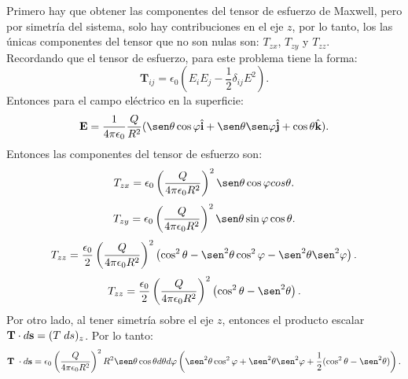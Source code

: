 \documentclass[11pt,fleqn]{book} %
\begin{document}
\begin{example}
\begin{equation}
\end{equation}
Primero hay que obtener las componentes del tensor de esfuerzo de Maxwell, pero por simetr\'ia del sistema, solo hay contribuciones en el eje $z$, por lo tanto, los las \'unicas componentes del tensor que no son nulas son: $T_{zx}$, $T_{zy}$ y $T_{zz}$.\\ Recordando que el tensor de esfuerzo, para este problema tiene la forma:
\begin{equation}
 \textbf{T}_{ij}=\epsilon_{0}\left( E_{i}E_{j}-\frac{1}{2}\delta_{ij}E^{2} \right). \label{prueba}
\end{equation}
 Entonces para el campo el\'ectrico en la superficie:
\begin{eqnarray*}
\textbf{E}=\frac{1}{4\pi\epsilon_{0}}\frac{Q}{R^{2}} (\sen \theta \cos \varphi \hat{\textbf{i}}+\sen \theta \sen \varphi \hat{\textbf{j}}+\cos \theta \hat{\textbf{k}}).
\end{eqnarray*}
 Entonces las componentes del tensor de esfuerzo son:
\begin{equation}
T_{zx}=\epsilon_{0}\left(\frac{Q}{4 \pi \epsilon_{0}R^{2}} \right)^{2}\sen \theta \cos \varphi cos \theta.
\end{equation}
\begin{equation}
T_{zy}=\epsilon_{0}\left(\frac{Q}{4 \pi \epsilon_{0}R^{2}} \right)^{2}\sen \theta \sin \varphi \cos \theta.
\end{equation}
\begin{eqnarray*}
T_{zz}=\frac{\epsilon_{0}}{2}\left(\frac{Q}{4 \pi \epsilon_{0}R^{2}} \right)^{2}\left(\cos^{2} \theta- \sen^{2} \theta \cos^{2} \varphi- \sen^{2} \theta \sen^{2} \varphi\right).
\end{eqnarray*}
 \begin{equation}
 T_{zz}=\frac{\epsilon_{0}}{2}\left(\frac{Q}{4 \pi \epsilon_{0}R^{2}} \right)^{2}\left(\cos^{2} \theta- \sen^{2}\theta\right).
 \end{equation}
Por otro lado, al tener simetr\'ia sobre el eje $z$, entonces el producto escalar $\textbf{T}\cdot d\textbf{s}=(T\hspace{1mm}ds)_{z}$. Por lo tanto:
\begin{eqnarray*}
\textbf{T}\hspace{1mm}\cdot d\textbf{s}=\epsilon_{0}\left(\frac{Q}{4 \pi \epsilon_{0}R^{2}} \right)^{2}R^{2}\sen \theta \cos \theta d\theta d\varphi\left(\sen^{2} \theta \cos^{2} \varphi+\sen^{2} \theta \sen^{2} \varphi+\frac{1}{2}(\cos^{2} \theta - \sen^{2} \theta)  \right).
\end{eqnarray*}

\end{example}
\end{document}
